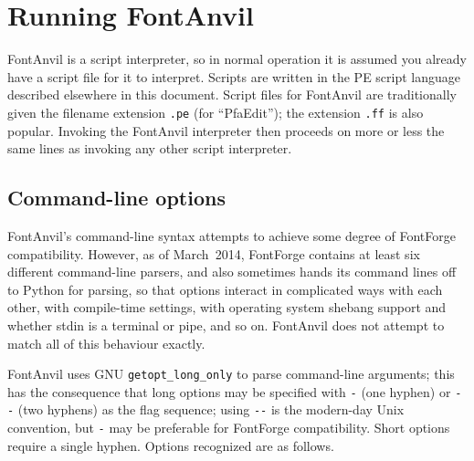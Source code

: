 \chapter{Running FontAnvil}

FontAnvil is a script interpreter, so in normal operation it is assumed you
already have a script file for it to interpret.  Scripts are written in the
PE script language described elsewhere in this document.  Script files for
FontAnvil are traditionally given the filename extension \texttt{.pe} (for
``PfaEdit''); the extension \texttt{.ff} is also popular.  Invoking the
FontAnvil interpreter then proceeds on more or less the same lines as
invoking any other script interpreter.

\section{Command-line options}

\begin{framed}
FontAnvil's command-line syntax attempts to achieve some degree of FontForge
compatibility.  However, as of March~2014, FontForge contains at least six
different command-line
parsers,\footnotemark{} and
also sometimes hands its command lines off to Python for parsing, so that
options interact in complicated ways with each other, with compile-time
settings, with operating system shebang support and whether stdin is a
terminal or pipe, and so on.  FontAnvil does not attempt to match all of
this behaviour exactly.
\end{framed}


FontAnvil uses GNU \texttt{getopt\_long\_only} to parse command-line
arguments; this has the consequence that long options may be specified with
\texttt{-} (one hyphen) or \texttt{-{}-} (two hyphens) as the flag sequence;
using \texttt{-{}-} is the modern-day Unix convention, but \texttt{-} may be
preferable for FontForge compatibility.  Short options require a single
hyphen.  Options recognized are as follows.

